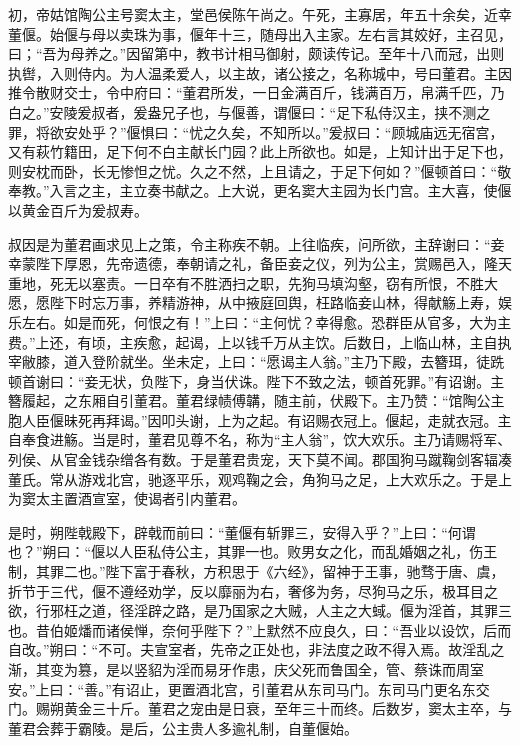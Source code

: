 \documentclass[12pt,UTF8]{ctexbook}
\begin{document}
初，帝姑馆陶公主号窦太主，堂邑侯陈午尚之。午死，主寡居，年五十余矣，近幸董偃。始偃与母以卖珠为事，偃年十三，随母出入主家。左右言其姣好，主召见，曰；“吾为母养之。”因留第中，教书计相马御射，颇读传记。至年十八而冠，出则执辔，入则侍内。为人温柔爱人，以主故，诸公接之，名称城中，号曰董君。主因推令散财交士，令中府曰：“董君所发，一日金满百斤，钱满百万，帛满千匹，乃白之。”安陵爰叔者，爰盎兄子也，与偃善，谓偃曰：“足下私侍汉主，挟不测之罪，将欲安处乎？”偃惧曰：“忧之久矣，不知所以。”爰叔曰：“顾城庙远无宿宫，又有萩竹籍田，足下何不白主献长门园？此上所欲也。如是，上知计出于足下也，则安枕而卧，长无惨怛之忧。久之不然，上且请之，于足下何如？”偃顿首曰：“敬奉教。”入言之主，主立奏书献之。上大说，更名窦大主园为长门宫。主大喜，使偃以黄金百斤为爰叔寿。



叔因是为董君画求见上之策，令主称疾不朝。上往临疾，问所欲，主辞谢曰：“妾幸蒙陛下厚恩，先帝遗德，奉朝请之礼，备臣妾之仪，列为公主，赏赐邑入，隆天重地，死无以塞责。一日卒有不胜洒扫之职，先狗马填沟壑，窃有所恨，不胜大愿，愿陛下时忘万事，养精游神，从中掖庭回舆，枉路临妾山林，得献觞上寿，娱乐左右。如是而死，何恨之有！”上曰：“主何忧？幸得愈。恐群臣从官多，大为主费。”上还，有顷，主疾愈，起谒，上以钱千万从主饮。后数日，上临山林，主自执宰敝膝，道入登阶就坐。坐未定，上曰：“愿谒主人翁。”主乃下殿，去簪珥，徒跣顿首谢曰：“妾无状，负陛下，身当伏诛。陛下不致之法，顿首死罪。”有诏谢。主簪履起，之东厢自引董君。董君绿帻傅韝，随主前，伏殿下。主乃赞：“馆陶公主胞人臣偃昧死再拜谒。”因叩头谢，上为之起。有诏赐衣冠上。偃起，走就衣冠。主自奉食进觞。当是时，董君见尊不名，称为“主人翁”，饮大欢乐。主乃请赐将军、列侯、从官金钱杂缯各有数。于是董君贵宠，天下莫不闻。郡国狗马蹴鞠剑客辐凑董氏。常从游戏北宫，驰逐平乐，观鸡鞠之会，角狗马之足，上大欢乐之。于是上为窦太主置酒宣室，使谒者引内董君。



是时，朔陛戟殿下，辟戟而前曰：“董偃有斩罪三，安得入乎？”上曰：“何谓也？”朔曰：“偃以人臣私侍公主，其罪一也。败男女之化，而乱婚姻之礼，伤王制，其罪二也。”陛下富于春秋，方积思于《六经》，留神于王事，驰骛于唐、虞，折节于三代，偃不遵经劝学，反以靡丽为右，奢侈为务，尽狗马之乐，极耳目之欲，行邪枉之道，径淫辟之路，是乃国家之大贼，人主之大蜮。偃为淫首，其罪三也。昔伯姬燔而诸侯惮，奈何乎陛下？”上默然不应良久，曰：“吾业以设饮，后而自改。”朔曰：“不可。夫宣室者，先帝之正处也，非法度之政不得入焉。故淫乱之渐，其变为篡，是以竖貂为淫而易牙作患，庆父死而鲁国全，管、蔡诛而周室安。”上曰：“善。”有诏止，更置酒北宫，引董君从东司马门。东司马门更名东交门。赐朔黄金三十斤。董君之宠由是日衰，至年三十而终。后数岁，窦太主卒，与董君会葬于霸陵。是后，公主贵人多逾礼制，自董偃始。
\end{document}
